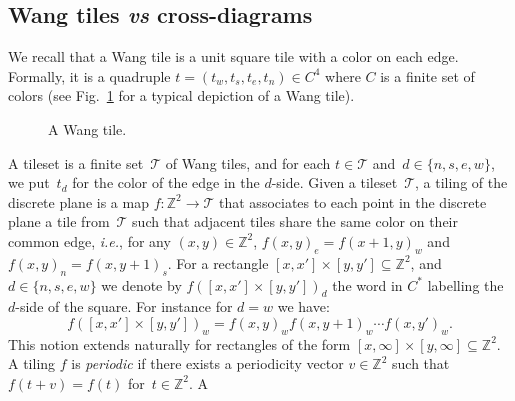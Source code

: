 \documentclass{amsart}
\begin{document}
\subsection{Wang tiles \emph{vs} cross-diagrams}
We recall that a Wang tile is a unit square tile with a color on each edge. Formally, it is a quadruple $t=(t_{w}, t_{s}, t_{e}, t_{n})\in C^{4}$ where $C$ is a finite set of colors (see Fig.~\ref{fig: wang tile} for a typical depiction of a Wang tile).
\begin{figure}[h]
\begin{center}
\caption{A Wang tile.}
\label{fig: wang tile}
\end{center}
\end{figure}
A tileset is a finite set~$\mathcal{T}$ of Wang tiles, and for each $t\in \mathcal{T}$ and~$d\in\{n,s,e,w\}$, we put~$t_{d}$ for the color of the edge in the $d$-side. Given a tileset~$\mathcal{T}$, a tiling of the discrete plane is a map $f: \mathbb{Z}^{2}\rightarrow \mathcal{T}$ that associates to each point in the discrete plane a tile from~$\mathcal{T}$ such that adjacent tiles share the same color on their common edge, \emph{i.e.}, for any $(x,y)\in\mathbb{Z}^{2}$, $f(x,y)_{e}=f(x+1,y)_{w}$ and $f(x,y)_{n}=f(x,y+1)_{s}$. For a rectangle $[x,x']\times [y,y']\subseteq \mathbb{Z}^{2}$, and $d\in \{n,s,e,w\}$ we denote by $f\left([x,x']\times [y,y']\right)_{d}$ the word in $C^{*}$ labelling the $d$-side of the square. For instance for $d=w$ we have:
$$
f\left([x,x']\times [y,y']\right)_{w}=f(x,y)_{w}f(x,y+1)_{w}\cdots f(x,y')_{w}.
$$
This notion extends naturally for rectangles of the form $[x,\infty]\times [y,\infty]\subseteq \mathbb{Z}^{2}$.\\
A tiling $f$ is \emph{periodic} if there exists a periodicity vector
$v\in \mathbb{Z}^{2}$ such that $f(t+v)=f(t)$ for~$t\in\mathbb{Z}^{2}$. A
\end{document}
